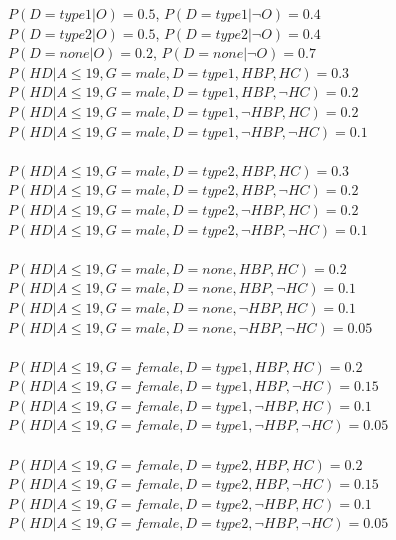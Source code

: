 \documentclass{article}
\begin{document}
$P(D = type1 | O) = 0.5$, $P(D = type1 | \neg O) = 0.4$\\
$P(D = type2 | O) = 0.5$, $P(D = type2 | \neg O) = 0.4$\\
$P(D = none | O) = 0.2$, $P(D = none | \neg O) = 0.7$\\

$P(HD | A \leq 19, G = male, D = type1, HBP, HC) = 0.3 $\\
$P(HD | A \leq 19, G = male, D = type1, HBP, \neg HC) = 0.2$\\
$P(HD | A \leq 19, G = male, D = type1, \neg HBP, HC) = 0.2$\\
$P(HD | A \leq 19, G = male, D = type1, \neg HBP, \neg HC) = 0.1$\\
\\
$P(HD | A \leq 19, G = male, D = type2, HBP, HC) = 0.3 $\\
$P(HD | A \leq 19, G = male, D = type2, HBP, \neg HC) = 0.2$\\
$P(HD | A \leq 19, G = male, D = type2, \neg HBP, HC) = 0.2$\\
$P(HD | A \leq 19, G = male, D = type2, \neg HBP, \neg HC) = 0.1$\\
\\
$P(HD | A \leq 19, G = male, D = none, HBP, HC) = 0.2 $\\
$P(HD | A \leq 19, G = male, D = none, HBP, \neg HC) = 0.1$\\
$P(HD | A \leq 19, G = male, D = none, \neg HBP, HC) = 0.1$\\
$P(HD | A \leq 19, G = male, D = none, \neg HBP, \neg HC) = 0.05$\\
\\
$P(HD | A \leq 19, G = female, D = type1, HBP, HC) = 0.2 $\\
$P(HD | A \leq 19, G = female, D = type1, HBP, \neg HC) = 0.15$\\
$P(HD | A \leq 19, G = female, D = type1, \neg HBP, HC) = 0.1$\\
$P(HD | A \leq 19, G = female, D = type1, \neg HBP, \neg HC) = 0.05$\\
\\
$P(HD | A \leq 19, G = female, D = type2, HBP, HC) = 0.2 $\\
$P(HD | A \leq 19, G = female, D = type2, HBP, \neg HC) = 0.15$\\
$P(HD | A \leq 19, G = female, D = type2, \neg HBP, HC) = 0.1$\\
$P(HD | A \leq 19, G = female, D = type2, \neg HBP, \neg HC) = 0.05$\\
\\
\end{document}
